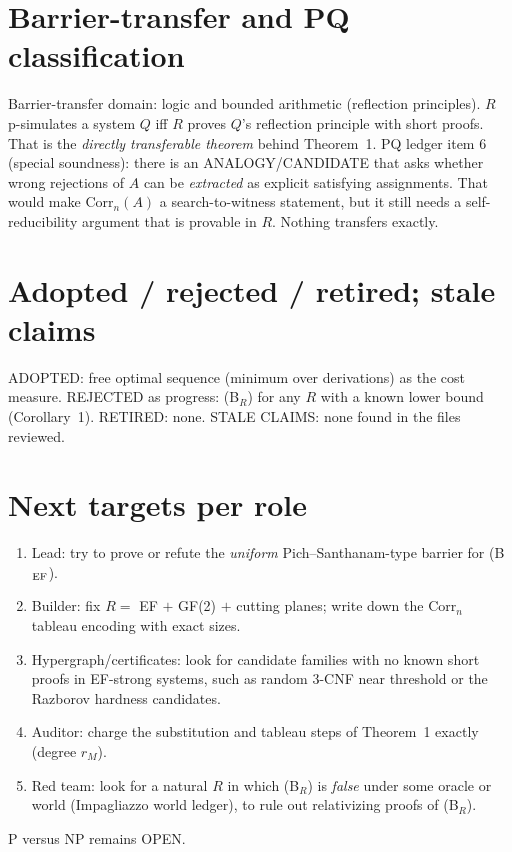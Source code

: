 \documentclass[11pt]{article}
\begin{document}
\section{Barrier-transfer and PQ classification}
Barrier-transfer domain: logic and bounded arithmetic (reflection principles).
$R$ p-simulates a system $Q$ iff $R$ proves $Q$'s reflection principle with short proofs. That is the
\emph{directly transferable theorem} behind Theorem~1. PQ ledger item 6 (special
soundness): there is an ANALOGY/CANDIDATE that asks whether wrong rejections of $A$ can be \emph{extracted} as
explicit satisfying assignments. That would make $\mathrm{Corr}_n(A)$ a search-to-witness statement, but it
still needs a self-reducibility argument that is provable in $R$. Nothing transfers exactly.

\section{Adopted / rejected / retired; stale claims}
ADOPTED: free optimal sequence (minimum over derivations) as the cost measure. REJECTED as
progress: (B$_R$) for any $R$ with a known lower bound (Corollary~1). RETIRED: none. STALE CLAIMS:
none found in the files reviewed.

\section{Next targets per role}
\begin{enumerate}
\item Lead: try to prove or refute the \emph{uniform} Pich--Santhanam-type barrier for
(B$_{\rm EF}$).
\item Builder: fix $R=$ EF $+$ GF(2) $+$ cutting planes; write down the $\mathrm{Corr}_n$ tableau encoding with exact sizes.
\item Hypergraph/certificates: look for candidate families with no known short proofs in EF-strong
systems, such as random 3-CNF near threshold or the Razborov hardness candidates.
\item Auditor: charge the substitution and tableau steps of Theorem~1 exactly (degree $r_M$).
\item Red team: look for a natural $R$ in which (B$_R$) is \emph{false} under some
oracle or world (Impagliazzo world ledger), to rule out relativizing proofs of (B$_R$).
\end{enumerate}
P versus NP remains OPEN.
\end{document}
